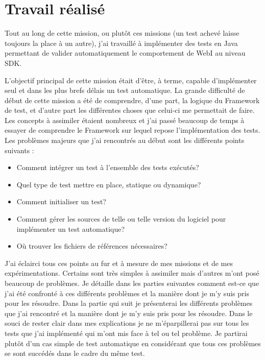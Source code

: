 \section{Travail r\'{e}alis\'{e}}

Tout au long de cette mission, ou plut\^{o}t ces missions (un test achev\'{e} laisse toujours la place \`{a} un autre), j'ai travaill\'{e} \`{a} impl\'{e}menter des tests en \gls{Java} permettant de valider automatiquement le comportement de WebI au niveau SDK.

L'objectif principal de cette mission \'{e}tait d'\^{e}tre, \`{a} terme, capable d'impl\'{e}menter seul et dans les plus brefs d\'{e}lais un test automatique. La grande difficult\'{e} de d\'{e}but de cette mission a \'{e}t\'{e} de comprendre, d'une part, la logique du \gls{Framework} de test, et d'autre part les diff\'{e}rentes choses que celui-ci me permettait de faire.\\

Les concepts \`{a} assimiler \'{e}taient nombreux et j'ai pass\'{e} beaucoup de temps \`{a} essayer de comprendre le \gls{Framework} sur lequel repose l'impl\'{e}mentation des tests. Les probl\`{e}mes majeurs que j'ai rencontr\'{e}s au d\'{e}but sont les diff\'{e}rents points suivants :
\begin{itemize}
	\item Comment int\'{e}grer un test \`{a} l'ensemble des tests ex\'{e}cut\'{e}s?
  \item Quel type de test mettre en place, statique ou dynamique?
	\item Comment initialiser un test?
	\item Comment g\'{e}rer les sources de telle ou telle version du logiciel pour impl\'{e}menter un test automatique?
	\item O\`{u} trouver les fichiers de r\'{e}f\'{e}rences n\'{e}cessaires?
\end{itemize}

J'ai \'{e}clairci tous ces points au fur et \`{a} mesure de mes missions et de mes exp\'{e}rimentations. Certains sont tr\`{e}s simples \`{a} assimiler mais d'autres m'ont pos\'{e} beaucoup de probl\`{e}mes. Je d\'{e}taille dans les parties suivantes comment est-ce que j'ai \'{e}t\'{e} confront\'{e} \`{a} ces diff\'{e}rents probl\`{e}mes et la mani\`{e}re dont je m'y suis pris pour les r\'{e}soudre. Dans la partie qui suit je pr\'{e}senterai les diff\'{e}rents probl\`{e}mes que j'ai rencontr\'{e} et la mani\`{e}re dont je m'y suis pris pour les r\'{e}soudre. Dans le souci de rester clair dans mes explications je ne m'\'{e}parpillerai pas sur tous les tests que j'ai impl\'{e}ment\'{e} qui m'ont mis face \`{a} tel ou tel probl\`{e}me. Je partirai plut\^{o}t d'un cas simple de test automatique en consid\'{e}rant que tous ces probl\`{e}mes se sont succ\'{e}d\'{e}s dans le cadre du m\^{e}me test.\\


